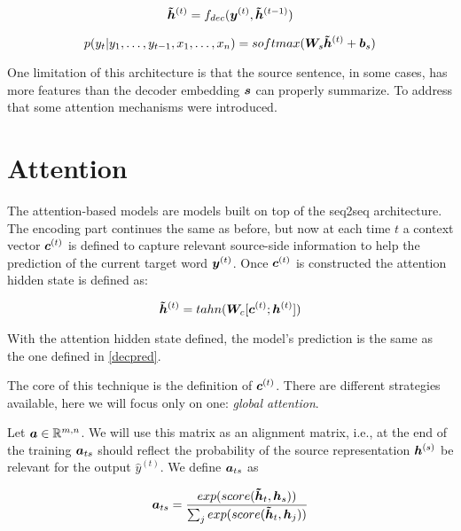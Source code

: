 \begin{equation}
\bm{\tilde{h}}^{(t)} = f_{dec}(\bm{y}^{(t)}, \bm{\tilde{h}}^{(t-1)})
\end{equation}

\begin{equation}
\label{decpred}
p(y_t | y_1, \dots, y_{t-1}, x_1, \dots, x_{n}) = softmax(\bm{W}_{s}  \bm{\tilde{h}}^{(t)} + \bm{b}_s)
\end{equation}

One limitation of this architecture is that the source sentence, in some cases, has more features than the decoder embedding $\bm{s}$ can properly summarize. To address that some attention mechanisms were introduced.

\section{Attention}
\label{sec:Attention}

The attention-based models are models built on top of the seq2seq architecture. The encoding part continues the same as before, but now at each time $t$ a context vector $\bm{c}^{(t)}$ is defined to capture relevant source-side information to help the prediction of the current target word $\bm{y}^{(t)}$. Once $\bm{c}^{(t)}$ is constructed the attention hidden state is defined as:   

\begin{equation}
\bm{\tilde{h}}^{(t)} = tahn(\bm{W}_c[\bm{c}^{(t)};\bm{h}^{(t)}])
\end{equation}

With the attention hidden state defined, the model's prediction is the same as the one defined in \ref{decpred}.

The core of this technique is the definition of $\bm{c}^{(t)}$. There are different strategies available, here we will focus only on one: \textit{global attention}.

Let $\bm{a} \in \mathbb{R}^{m,n}$. We will use this matrix as an alignment matrix, i.e., at the end of the training $\bm{a}_{ts}$ should reflect the probability of the source representation $\bm{h}^{(s)}$ be relevant for the output $\hat{y}^{(t)}$. We define $\bm{a}_{ts}$ as


\begin{equation}
\bm{a}_{ts} = \frac{exp(score(\bm{\tilde{h}}_t,\bm{h}_s))}{\sum_j exp(score(\bm{\tilde{h}}_t,\bm{h}_j))}
\end{equation}

